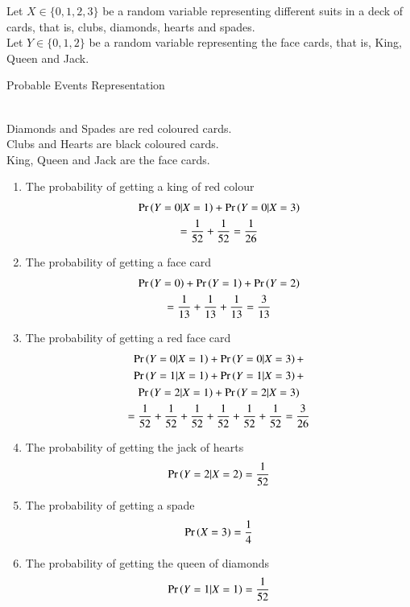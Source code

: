 \documentclass[journal,12pt,twocolumn]{IEEEtran}
\begin{document}
Let $X \in \{0,1,2,3\} $ be a random variable representing different suits in a deck of cards, that is, clubs, diamonds, hearts and spades.\\
Let $Y \in \{0,1,2\} $ be a random variable representing the face cards, that is, King, Queen and Jack.
\begin{table}[ht!]

\caption{Probable Events Representation}
\label{tables:table1}
\end{table}\\
Diamonds and Spades are red coloured cards.\\
Clubs and Hearts are black coloured cards.\\
King, Queen and Jack are the face cards.\\
\begin{enumerate}
    \item The probability of getting a king of red colour
        \begin{multline}
			\Pr\left(Y=0|X=1\right) + \Pr\left(Y=0|X=3\right) \\
	   	= \frac{1}{52} + \frac{1}{52}
        = \frac{1}{26}
			\end{multline}
	\item The probability of getting a face card 
	   \begin{multline}
	   	\Pr\left(Y=0\right) + \Pr\left(Y=1\right) + \Pr\left(Y=2\right) \\
	   	= \frac{1}{13} + \frac{1}{13} + \frac{1}{13}
        = \frac{3}{13}
	   \end{multline}
	\item The probability of getting a red face card
	   \begin{multline}
	   	\Pr\left(Y=0|X=1\right) + \Pr\left(Y=0|X=3\right) + \\\Pr\left(Y=1|X=1\right) + \Pr\left(Y=1|X=3\right) +\\ \Pr\left(Y=2|X=1\right) + \Pr\left(Y=2|X=3\right)\\ 
	   	= \frac{1}{52} + \frac{1}{52} + \frac{1}{52} + \frac{1}{52} + \frac{1}{52} + \frac{1}{52} 
        = \frac{3}{26}
	   \end{multline}
	\item The probability of getting the jack of hearts
	   \begin{align}
	   	\Pr\left(Y=2|X=2\right) 
	   	= \frac{1}{52} 
	   \end{align}
	 \item The probability of getting a spade 
	   \begin{align}
	   	\Pr\left(X=3\right) 
	   	= \frac{1}{4} 
	   \end{align} 
	  \item The probability of getting the queen of diamonds 
	   \begin{align}
	   	\Pr\left(Y=1|X=1\right) 
	   	= \frac{1}{52} 
	   \end{align} 
\end{enumerate}
\end{document}
